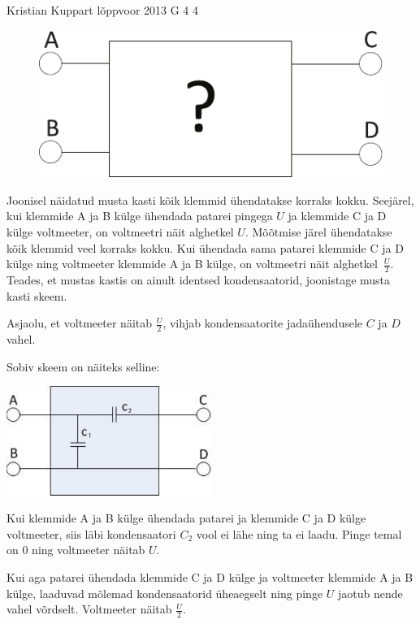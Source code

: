 {Kristian Kuppart} %
{lõppvoor} %
{2013} %
{G 4} %
{4} %
{
\ifStatement
\begin{figure}%
\includegraphics[width=\linewidth]{2013-v3g-04-pilt1}%
\end{figure}
Joonisel näidatud musta kasti kõik klemmid ühendatakse korraks kokku.
Seejärel, kui klemmide A ja B külge ühendada patarei
pingega $U$ ja klemmide C ja D külge voltmeeter, on voltmeetri näit alghetkel
$U$. Mõõtmise järel ühendatakse kõik klemmid veel korraks kokku.
Kui ühendada sama patarei klemmide C ja D külge ning voltmeeter
klemmide A ja B külge, on voltmeetri näit alghetkel~$\frac{U}{2}.$
Teades, et mustas kastis on ainult identsed kondensaatorid, joonistage musta kasti skeem.
\fi


\ifHint
Asjaolu, et voltmeeter näitab $\frac{U}{2}$, vihjab kondensaatorite jadaühendusele $C$ ja $D$ vahel.
\fi


\ifSolution
Sobiv skeem on näiteks selline:

\begin{center}
\includegraphics[width=0.5\textwidth]{2013-v3g-04-mustkastlah}\\
\end{center}

Kui klemmide A ja B külge ühendada patarei ja klemmide C ja D külge voltmeeter, siis läbi kondensaatori $C_2$ vool ei lähe ning ta ei laadu. Pinge temal on \num{0} ning voltmeeter näitab $U$.

Kui aga patarei ühendada klemmide C ja D külge ja voltmeeter klemmide A ja B külge, laaduvad mõlemad kondensaatorid üheaegselt ning pinge $U$ jaotub nende vahel võrdselt. Voltmeeter näitab $\frac{U}{2}$.
\fi


}
